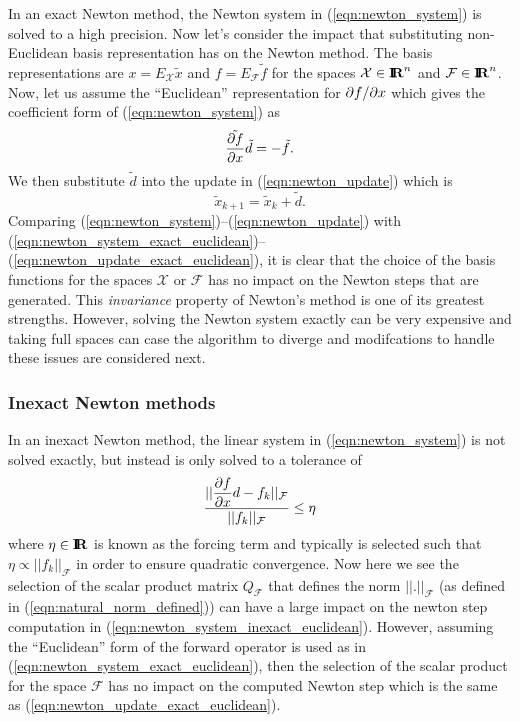 In an exact Newton method, the Newton system in (\ref{eqn:newton_system}) is
solved to a high precision.  Now let's consider the impact that substituting
non-Euclidean basis representation has on the Newton method.  The basis
representations are $x = E_{\mathcal{X}}\tilde{x}$ and $f =
E_{\mathcal{F}}\tilde{f}$ for the spaces $\mathcal{X}\in\mbox{\textbf{I}}\hspace{-0.6ex}\mbox{\textbf{R}}^n$ and
$\mathcal{F}\in\mbox{\textbf{I}}\hspace{-0.6ex}\mbox{\textbf{R}}^n$.  Now, let us assume the ``Euclidean'' representation
for $\partial f / \partial x$ which gives the coefficient form of (\ref{eqn:newton_system})
as
%
\begin{equation}
\tilde{\displaystyle{\frac{\partial f}{\partial x}}} \tilde{d} = - \tilde{f}.
\label{eqn:newton_system_exact_euclidean}
\end{equation}
%
We then substitute $\tilde d$ into the update in (\ref{eqn:newton_update})
which is
%
\begin{equation}
\tilde{x}_{k+1} = \tilde{x}_k + \tilde{d}.
\label{eqn:newton_update_exact_euclidean}
\end{equation}
%
Comparing (\ref{eqn:newton_system})--(\ref{eqn:newton_update}) with
(\ref{eqn:newton_system_exact_euclidean})--(\ref{eqn:newton_update_exact_euclidean}),
it is clear that the choice of the basis functions for the spaces
$\mathcal{X}$ or $\mathcal{F}$ has no impact on the Newton steps that are
generated.  This {}\textit{invariance} property of Newton's method is one of
its greatest strengths.  However, solving the Newton system exactly can be
very expensive and taking full spaces can case the algorithm to diverge and
modifcations to handle these issues are considered next.

\subsubsection*{Inexact Newton methods}

In an inexact Newton method, the linear system in (\ref{eqn:newton_system}) is
not solved exactly, but instead is only solved to a tolerance of
%
\begin{equation}
\frac{||\displaystyle{\frac{\partial f}{\partial x}} d - f_k||_{\mathcal{F}}}{||f_k||_{\mathcal{F}}} \le \eta
\label{eqn:newton_system_inexact_euclidean}
\end{equation}
%
where $\eta\in\mbox{\textbf{I}}\hspace{-0.6ex}\mbox{\textbf{R}}$ is known as the forcing term and typically is selected such
that $\eta {}\propto ||f_k||_{\mathcal{F}}$ in order to ensure quadratic
convergence.  Now here we see the selection of the scalar product matrix
$Q_{\mathcal{F}}$ that defines the norm $||.||_{\mathcal{F}}$ (as defined in
(\ref{eqn:natural_norm_defined})) can have a large impact on the newton step
computation in (\ref{eqn:newton_system_inexact_euclidean}).  However, assuming
the ``Euclidean'' form of the forward operator is used as in
(\ref{eqn:newton_system_exact_euclidean}), then the selection of the scalar
product for the space $\mathcal{F}$ has no impact on the computed Newton step
which is the same as (\ref{eqn:newton_update_exact_euclidean}).

